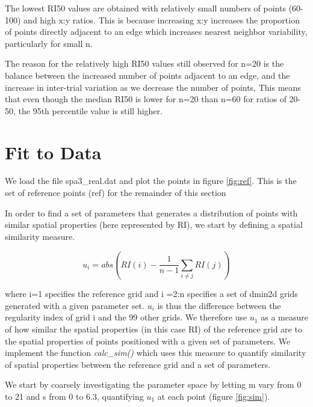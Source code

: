 \documentclass{article}
\begin{document}
The lowest RI50 values are obtained with relatively small numbers of points (60-100) and high x:y ratios. This is because increasing x:y increases the proportion of points directly adjacent to an edge which increases nearest neighbor variability, particularly for small n.

The reason for the relatively high RI50 values still observed for n=20 is the balance between the increased number of points adjacent to an edge, and the increase in inter-trial variation as we decrease the number of points, This means that even though the median RI50 is lower for n=20 than n=60 for ratios of 20-50, the 95th percentile value is still higher.

\section{Fit to Data}

We load the file spa3\_real.dat and plot the points in figure \ref{fig:ref}. This is the set of reference points (ref) for the remainder of this section

In order to find a set of parameters that generates a distribution of points with similar spatial properties (here represented by RI), we start by defining a spatial similarity measure.

\begin{equation}
u_i = abs(RI(i) - \dfrac{1}{n-1}\sum_{i \neq j}{RI(j)})
\end{equation}

where i=1 specifies the reference grid and i =2:n specifies a set of dmin2d grids generated with a given parameter set.
$u_i$ is thus the difference between the regularity index of grid i and the 99 other grids. We therefore use $u_1$ as a measure of how similar the spatial properties (in this case RI) of the reference grid are to the spatial properties of points positioned with a given set of parameters.
We implement the function \textit{calc\_sim()} which uses this measure to quantify similarity of spatial properties between the reference grid and a set of parameters.

We start by coarsely investigating the parameter space by letting m vary from 0 to 21 and s from 0 to 6.3, quantifying $u_1$ at each point (figure \ref{fig:sim}).
\end{document}
